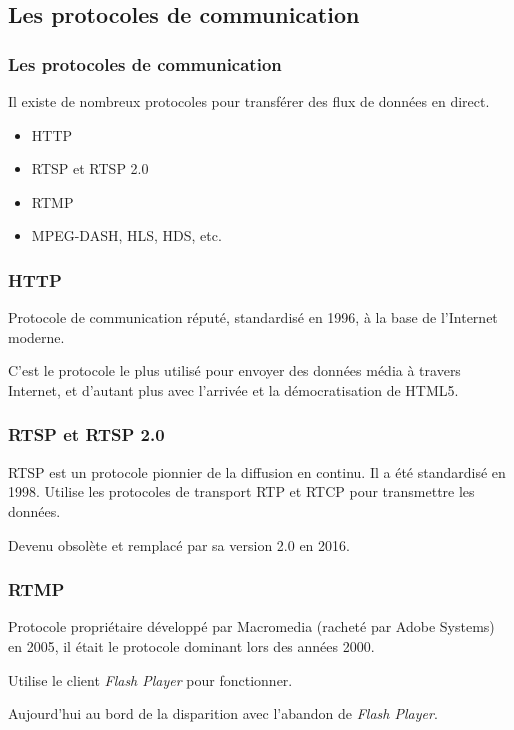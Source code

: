 \documentclass{beamer}
\begin{document}
\subsection{Les protocoles de communication}

\begin{frame}	
\frametitle{Les protocoles de communication}

Il existe de nombreux protocoles pour transférer des flux de données en direct.

\begin{itemize}
	\item HTTP
	\item RTSP et RTSP 2.0
	\item RTMP
	\item MPEG-DASH, HLS, HDS, etc.
\end{itemize}

\end{frame}

\begin{frame}	
\frametitle{HTTP}

Protocole de communication réputé, standardisé en 1996, à la base de l'Internet moderne.

C'est le protocole le plus utilisé pour envoyer des données média à travers Internet, et d'autant plus avec l'arrivée et la démocratisation de HTML5.

\end{frame}

\begin{frame}	
\frametitle{RTSP et RTSP 2.0}

RTSP est un protocole pionnier de la diffusion en continu. Il a été standardisé en 1998.
Utilise les protocoles de transport RTP et RTCP pour transmettre les données.

Devenu obsolète et remplacé par sa version 2.0 en 2016.

\end{frame}

\begin{frame}	
\frametitle{RTMP}

Protocole propriétaire développé par Macromedia (racheté par Adobe Systems) en 2005, il était le protocole dominant lors des années 2000. 

Utilise le client \textit{Flash Player} pour fonctionner.

Aujourd'hui au bord de la disparition avec l'abandon de \textit{Flash Player}.

\end{frame}
\end{document}
